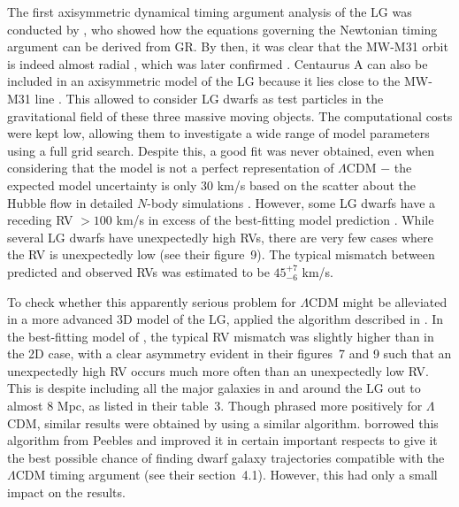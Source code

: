 \documentclass[fleqn,usenatbib,useAMS,onecolumn]{mnras} %
\begin{document}
The first axisymmetric dynamical timing argument analysis of the LG was conducted by \citet{Banik_Zhao_2016}, who showed how the equations governing the Newtonian timing argument can be derived from GR. By then, it was clear that the MW-M31 orbit is indeed almost radial \citep{Van_der_Marel_2012}, which was later confirmed \citep{Van_der_Marel_2019, Salomon_2021}. Centaurus A can also be included in an axisymmetric model of the LG because it lies close to the MW-M31 line \citep{Ma_1998}. This allowed \citet{Banik_Zhao_2016} to consider LG dwarfs as test particles in the gravitational field of these three massive moving objects. The computational costs were kept low, allowing them to investigate a wide range of model parameters using a full grid search. Despite this, a good fit was never obtained, even when considering that the model is not a perfect representation of $\Lambda$CDM $-$ the expected model uncertainty is only 30 km/s based on the scatter about the Hubble flow in detailed $N$-body simulations \citep{Aragon_Calvo_2011}. However, some LG dwarfs have a receding RV $>100$ km/s in excess of the best-fitting model prediction \citep{Banik_Zhao_2016}. While several LG dwarfs have unexpectedly high RVs, there are very few cases where the RV is unexpectedly low (see their figure~9). The typical mismatch between predicted and observed RVs was estimated to be $45^{+7}_{-6}$ km/s.

To check whether this apparently serious problem for $\Lambda$CDM might be alleviated in a more advanced 3D model of the LG, \citet{Banik_Zhao_2017} applied the algorithm described in \citet{Shaya_2011}. In the best-fitting model of \citet{Banik_Zhao_2017}, the typical RV mismatch was slightly higher than in the 2D case, with a clear asymmetry evident in their figures~7 and 9 such that an unexpectedly high RV occurs much more often than an unexpectedly low RV. This is despite including all the major galaxies in and around the LG out to almost 8 Mpc, as listed in their table~3. Though phrased more positively for $\Lambda$CDM, similar results were obtained by \citet{Peebles_2017} using a similar algorithm. \citet{Banik_2018_anisotropy} borrowed this algorithm from Peebles and improved it in certain important respects to give it the best possible chance of finding dwarf galaxy trajectories compatible with the $\Lambda$CDM timing argument (see their section~4.1). However, this had only a small impact on the results.
\end{document}
